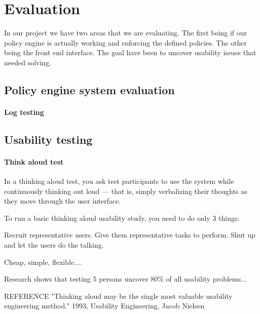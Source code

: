\section{Evaluation}
In our project we have two areas that we are evaluating. The first being if our policy engine is actually working and enforcing the defined policies. The other being the front end interface. The goal have been to uncover usability issues that needed solving.

\subsection{Policy engine system evaluation}

\paragraph{Log testing}




\subsection{Usability testing}

\paragraph{Think aloud test}

In a thinking aloud test, you ask test participants to use the system while continuously thinking out loud — that is, simply verbalizing their thoughts as they move through the user interface.

To run a basic thinking aloud usability study, you need to do only 3 things:

Recruit representative users.
Give them representative tasks to perform.
Shut up and let the users do the talking.


Cheap, simple, flexible....

Research shows that testing 5 persons uncover 80\% of all usability problems...


REFERENCE
"Thinking aloud may be the single most valuable usability engineering method." 1993, Usability Engineering, Jacob Nielsen
